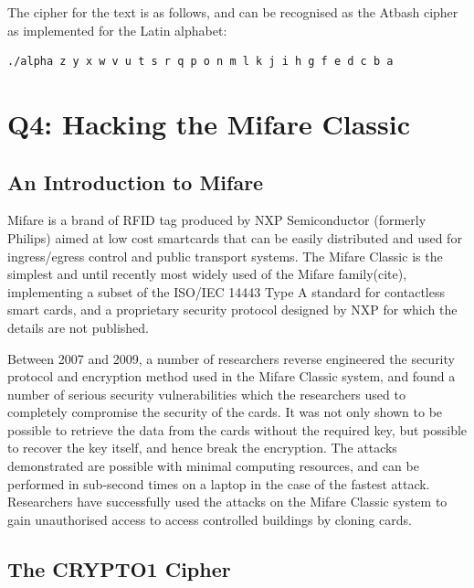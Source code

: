 \documentclass[pdflatex, a4paper,12pt]{article}
\begin{document}
\begin{quote}
    
\end{quote}    

The cipher for the text is as follows, and can be recognised as the Atbash
cipher as implemented for the Latin alphabet:

\begin{verbatim}
./alpha z y x w v u t s r q p o n m l k j i h g f e d c b a
\end{verbatim}

\section{Q4: Hacking the Mifare Classic}

\subsection{An Introduction to Mifare}

Mifare is a brand of RFID tag produced by NXP Semiconductor (formerly Philips)
aimed at low cost smartcards that can be easily distributed and used for
ingress/egress control and public transport systems. The Mifare Classic is the
simplest and until recently most widely used of the Mifare family(cite),
implementing a subset of the ISO/IEC 14443 Type A standard for contactless smart
cards, and a proprietary security protocol designed by NXP for which the details
are not published.

Between 2007 and 2009, a number of researchers reverse engineered the security
protocol and encryption method used in the Mifare Classic system, and found a
number of serious security vulnerabilities which the researchers used to
completely compromise the security of the cards. It was not only shown to be
possible to retrieve the data from the cards without the required key, but
possible to recover the key itself, and hence break the encryption. The attacks
demonstrated are possible with minimal computing resources, and can be performed
in sub-second times on a laptop in the case of the fastest attack. Researchers
have successfully used the attacks on the Mifare Classic system to gain unauthorised
access to access controlled buildings by cloning
cards\cite{digitalsecurityrun_mifare_2008}.

\subsection{The CRYPTO1 Cipher}
\end{document}
